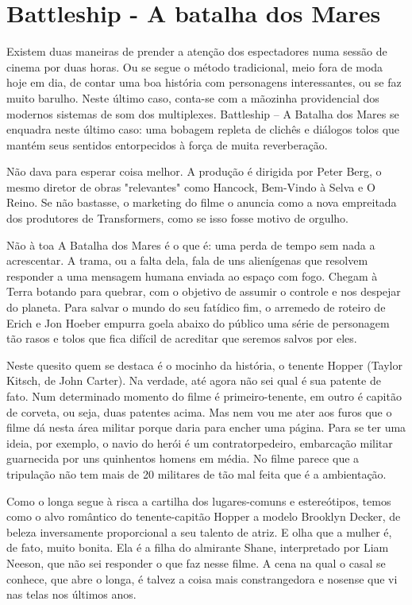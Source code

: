 \documentclass[a4paper,11pt,openright,openbib]{article}
\begin{document}
\section{Battleship - A batalha dos Mares}
Existem duas maneiras de prender a atenção dos espectadores numa sessão de cinema por duas horas. Ou se segue o método tradicional, meio fora de moda hoje em dia, de contar uma boa história com personagens interessantes, ou se faz muito barulho. Neste último caso, conta-se com a mãozinha providencial dos modernos sistemas de som dos multiplexes. Battleship – A Batalha dos Mares se enquadra neste último caso: uma bobagem repleta de clichês e diálogos tolos que mantém seus sentidos entorpecidos à força de muita reverberação. 

Não dava para esperar coisa melhor. A produção é dirigida por Peter Berg, o mesmo diretor de obras "relevantes" como Hancock, Bem-Vindo à Selva e O Reino. Se não bastasse, o marketing do filme o anuncia como a nova empreitada dos produtores de Transformers, como se isso fosse motivo de orgulho. 

Não à toa A Batalha dos Mares é o que é: uma perda de tempo sem nada a acrescentar. A trama, ou a falta dela, fala de uns alienígenas que resolvem responder a uma mensagem humana enviada ao espaço com fogo. Chegam à Terra botando para quebrar, com o objetivo de assumir o controle e nos despejar do planeta. Para salvar o mundo do seu fatídico fim, o arremedo de roteiro de Erich e Jon Hoeber empurra goela abaixo do público uma série de personagem tão rasos e tolos que fica difícil de acreditar que seremos salvos por eles. 

Neste quesito quem se destaca é o mocinho da história, o tenente Hopper (Taylor Kitsch, de John Carter). Na verdade, até agora não sei qual é sua patente de fato. Num determinado momento do filme é primeiro-tenente, em outro é capitão de corveta, ou seja, duas patentes acima. Mas nem vou me ater aos furos que o filme dá nesta área militar porque daria para encher uma página. Para se ter uma ideia, por exemplo, o navio do herói é um contratorpedeiro, embarcação militar guarnecida por uns quinhentos homens em média. No filme parece que a tripulação não tem mais de 20 militares de tão mal feita que é a ambientação. 

Como o longa segue à risca a cartilha dos lugares-comuns e estereótipos, temos como o alvo romântico do tenente-capitão Hopper a modelo Brooklyn Decker, de beleza inversamente proporcional a seu talento de atriz. E olha que a mulher é, de fato, muito bonita. Ela é a filha do almirante Shane, interpretado por Liam Neeson, que não sei responder o que faz nesse filme. A cena na qual o casal se conhece, que abre o longa, é talvez a coisa mais constrangedora e nosense que vi nas telas nos últimos anos. 
\end{document}
